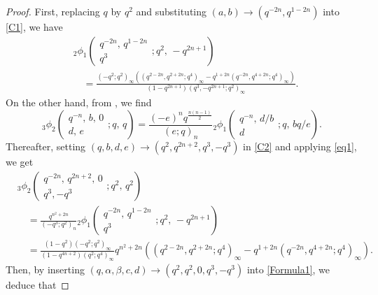 \documentclass[reqno,12pt]{amsart}
\theoremstyle{remark}
\numberwithin{equation}{section}
\begin{document}
\begin{proof}
First, replacing $q$ by $q^2$ and substituting $\left(a,b\right)\to\left(q^{-2n},q^{1-2n}\right)$ into \eqref{C1}, we have
\begin{align}
&{_2\phi_1}\left(
\begin{array}{cc}
q^{-2n},\,q^{1-2n}\\
q^3
\end{array};q^2,\,-q^{2n+1}\right)\nonumber\\
&\quad=\frac{\left(-q^2;q^2\right)_{\infty}\left(
\left(q^{2-2n},q^{2+2n};q^4\right)_{\infty}-q^{1+2n}
\left(q^{-2n},q^{4+2n};q^4\right)_{\infty}\right)}{\left(1-q^{2n+1}\right)
\left(q^3,-q^{2n+1};q^2\right)_{\infty}}.\label{eq1}
\end{align}
On the other hand, from \cite[p.71]{Gasper_and_Rahman}, we find 
\begin{equation}\label{C2}
_3\phi_2\left(
\begin{array}{ccc}
q^{-n},\,b,\,0\\
d,\,e
\end{array};q,\,q\right)
=\frac{\left(-e\right)^nq^{{\frac{n\left(n-1\right)}{2}}}}{\left(e;q\right)_n}
{_2\phi_1}\left(
\begin{array}{cc}
q^{-n},\,d/b\\
d
\end{array};q,\,bq/e\right).
\end{equation}
Thereafter, setting $\left(q,b,d,e\right)\to\left(q^2,q^{2n+2},q^3,-q^3\right)$ in \eqref{C2} and applying \eqref{eq1}, we get
\begin{align}
&{_3\phi_2}\left(
\begin{array}{ccc}
q^{-2n},\,q^{2n+2},\,0\\
q^3,-q^3
\end{array};q^2,\,q^2\right)\nonumber\\
&\quad=\frac{q^{n^2+2n}}{\left(-q^3;q^2\right)_n}{_2\phi_1}\left(
\begin{array}{cc}
q^{-2n},\,q^{1-2n}\\
q^3
\end{array};q^2,\,-q^{2n+1}\right)\nonumber\\
&\quad=\frac{\left(1-q^2\right)\left(-q^2;q^2\right)_{\infty}}
{\left(1-q^{4n+2}\right)\left(q^2;q^4\right)_{\infty}}q^{n^2+2n}\left(
\left(q^{2-2n},q^{2+2n};q^4\right)_{\infty}-q^{1+2n}
\left(q^{-2n},q^{4+2n};q^4\right)_{\infty}\right).\label{eq2}
\end{align}
Then, by inserting $\left(q,\alpha,\beta,c,d\right)\to\left(q^2,q^2,0,q^3,-q^3\right)$ into \eqref{Formula1}, we deduce that

\end{proof}
\end{document}
